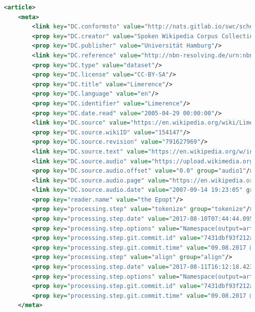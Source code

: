 \documentclass[12pt,a4paper,titlepage]{article}
\begin{document}
\begin{lstlisting}[language=XML,firstnumber=1, caption=Metadati delle annotazioni delle parole in un audio, label=metadati_annotazioni,captionpos=b]
<article>
	<meta>
		<link key="DC.conformsto" value="http://nats.gitlab.io/swc/schema/swc-1.0.rnc"/>
		<prop key="DC.creator" value="Spoken Wikipedia Corpus Collection Software"/>
		<prop key="DC.publisher" value="Universität Hamburg"/>
		<link key="DC.reference" value="http://nbn-resolving.de/urn:nbn:de:gbv:18-228-7-2209"/>
		<prop key="DC.type" value="dataset"/>
		<prop key="DC.license" value="CC-BY-SA"/>
		<prop key="DC.title" value="Limerence"/>
		<prop key="DC.language" value="en"/>
		<prop key="DC.identifier" value="Limerence"/>
		<prop key="DC.date.read" value="2005-04-29 00:00:00"/>
		<link key="DC.source" value="https://en.wikipedia.org/wiki/Limerence"/>
		<prop key="DC.source.wikiID" value="154147"/>
		<prop key="DC.source.revision" value="791627969"/>
		<link key="DC.source.text" value="https://en.wikipedia.org/w/index.php?title=Limerence&oldid=13811989"/>
		<link key="DC.source.audio" value="https://upload.wikimedia.org/wikipedia/commons/a/aa/Limerence.ogg" group="audio1"/>
		<prop key="DC.source.audio.offset" value="0.0" group="audio1"/>
		<link key="DC.source.audio.page" value="https://en.wikipedia.org/w/index.php?title=File%3aLimerence.ogg" group="audio1"/>
		<link key="DC.source.audio.date" value="2007-09-14 19:23:05" group="audio1"/>
		<prop key="reader.name" value="the Epopt"/>
		<prop key="processing.step" value="tokenize" group="tokenize"/>
		<prop key="processing.step.date" value="2017-08-10T07:44:44.095+02:00[Europe/Berlin]" group="tokenize"/>
		<prop key="processing.step.options" value="Namespace(output=articles/Limerence/tokenized.swc, all_sections=false, null_normalize=false, raw_output=null, subparser_name=tokenize, lang=en, no_introduction=false, article_dir=articles/Limerence)" group="tokenize"/>
		<prop key="processing.step.git.commit.id" value="7431dbf93f212ad828208abaf8f518fb8de11ff3" group="tokenize"/>
		<prop key="processing.step.git.commit.time" value="09.08.2017 @ 15:21:55 CEST" group="tokenize"/>
		<prop key="processing.step" value="align" group="align"/>
		<prop key="processing.step.date" value="2017-08-11T16:12:18.423+02:00[Europe/Berlin]" group="align"/>
		<prop key="processing.step.options" value="Namespace(output=articles/Limerence/aligned.swc, transcript=articles/Limerence/tokenized.swc, g2p=../model_en/model.fst.ser, phone=false, subparser_name=align, dict=../model_en/empty.dic, acoustic_model=../model_en/, audio=articles/Limerence/audio.wav)" group="align"/>
		<prop key="processing.step.git.commit.id" value="7431dbf93f212ad828208abaf8f518fb8de11ff3" group="align"/>
		<prop key="processing.step.git.commit.time" value="09.08.2017 @ 15:21:55 CEST" group="align"/>
	</meta>
\end{lstlisting}
\end{document}
